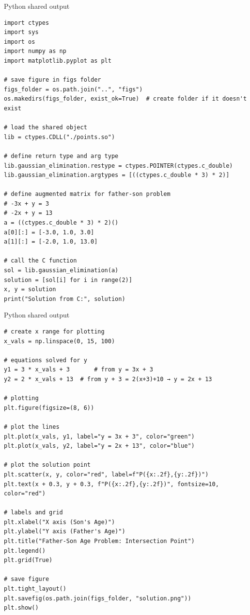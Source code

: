 \documentclass{beamer}
\numberwithin{equation}{section}
\theoremstyle{remark}
\begin{document}
\begin{frame}[fragile]{Python shared output}
\begin{lstlisting}
import ctypes
import sys
import os
import numpy as np
import matplotlib.pyplot as plt

# save figure in figs folder
figs_folder = os.path.join("..", "figs")
os.makedirs(figs_folder, exist_ok=True)  # create folder if it doesn't exist

# load the shared object
lib = ctypes.CDLL("./points.so")

# define return type and arg type
lib.gaussian_elimination.restype = ctypes.POINTER(ctypes.c_double)
lib.gaussian_elimination.argtypes = [((ctypes.c_double * 3) * 2)]

# define augmented matrix for father-son problem
# -3x + y = 3
# -2x + y = 13
a = ((ctypes.c_double * 3) * 2)()
a[0][:] = [-3.0, 1.0, 3.0]
a[1][:] = [-2.0, 1.0, 13.0]

# call the C function
sol = lib.gaussian_elimination(a)
solution = [sol[i] for i in range(2)]
x, y = solution
print("Solution from C:", solution)
\end{lstlisting}
\end{frame}
\begin{frame}[fragile]{Python shared output}
\begin{lstlisting}
# create x range for plotting
x_vals = np.linspace(0, 15, 100)

# equations solved for y
y1 = 3 * x_vals + 3       # from y = 3x + 3
y2 = 2 * x_vals + 13  # from y + 3 = 2(x+3)+10 → y = 2x + 13

# plotting
plt.figure(figsize=(8, 6))

# plot the lines
plt.plot(x_vals, y1, label="y = 3x + 3", color="green")
plt.plot(x_vals, y2, label="y = 2x + 13", color="blue")

# plot the solution point
plt.scatter(x, y, color="red", label=f"P({x:.2f},{y:.2f})")
plt.text(x + 0.3, y + 0.3, f"P({x:.2f},{y:.2f})", fontsize=10, color="red")

# labels and grid
plt.xlabel("X axis (Son's Age)")
plt.ylabel("Y axis (Father's Age)")
plt.title("Father-Son Age Problem: Intersection Point")
plt.legend()
plt.grid(True)

# save figure
plt.tight_layout()
plt.savefig(os.path.join(figs_folder, "solution.png"))
plt.show()

\end{lstlisting}
    
\end{frame}
\end{document}
